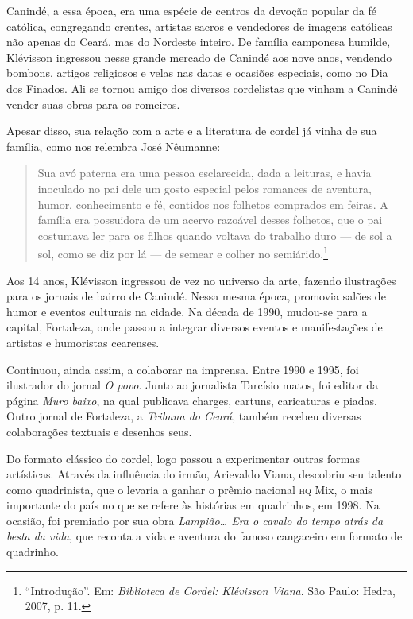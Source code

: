 \documentclass[11pt]{extarticle}
\begin{document}
Canindé, a essa época, era uma espécie de centros da devoção popular da fé católica, congregando crentes, artistas sacros e vendedores de imagens católicas não
apenas do Ceará, mas do Nordeste inteiro. De família camponesa humilde, Klévisson ingressou nesse grande mercado de Canindé aos nove anos, vendendo bombons, artigos religiosos e velas nas datas e ocasiões especiais, como no Dia dos Finados.
Ali se tornou amigo dos diversos cordelistas que vinham a Canindé vender suas obras para os romeiros.

Apesar disso, sua relação com a arte e a literatura de cordel já vinha de sua família, como nos relembra José Nêumanne:

\begin{quote}
Sua avó paterna era uma pessoa esclarecida, dada a leituras, e havia inoculado no pai dele um gosto especial pelos romances de aventura, humor, conhecimento e fé, contidos nos folhetos comprados em feiras. A família era possuidora de um acervo razoável desses folhetos, que o pai costumava ler para os filhos quando voltava do trabalho duro --- de sol a sol, como se diz por lá --- de semear e colher no semiárido.\footnote{``Introdução''. Em: \textit{Biblioteca de Cordel: Klévisson Viana}. São Paulo: Hedra, 2007, p. 11.}
\end{quote}

Aos 14 anos, Klévisson ingressou de vez no universo da arte, fazendo ilustrações para os jornais de bairro de Canindé. Nessa mesma época, promovia salões de humor e eventos culturais na cidade. Na década de 1990, mudou-se para a capital, Fortaleza, onde passou a integrar diversos eventos e manifestações de artistas e humoristas cearenses.

Continuou, ainda assim, a colaborar na imprensa. Entre 1990 e 1995, foi ilustrador do jornal \textit{O povo}. Junto ao jornalista Tarcísio matos, foi editor da página \textit{Muro baixo}, na qual publicava charges, cartuns, caricaturas e piadas. Outro jornal de Fortaleza, a
\textit{Tribuna do Ceará}, também recebeu diversas colaborações textuais e desenhos seus.

Do formato clássico do cordel, logo passou a experimentar outras formas artísticas. Através da influência do irmão, Arievaldo Viana, descobriu seu talento como quadrinista, que o levaria a ganhar o prêmio nacional \textsc{hq} Mix, o mais importante do país no que se refere às histórias em quadrinhos, em 1998. Na ocasião, foi premiado por sua obra \textit{Lampião\ldots{} Era o cavalo do tempo atrás da besta da vida}, que reconta a vida e aventura do famoso cangaceiro em formato de quadrinho.
\end{document}
